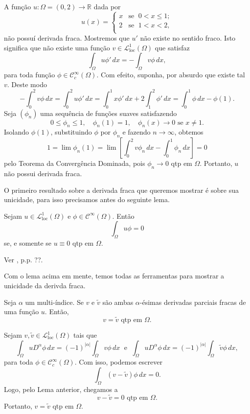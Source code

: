 \documentclass[a4paper, 11pt]{book}
\theoremstyle{definition}
\newcommand{\bR}{\mathbb{R}}
\newcommand{\cC}{\mathcal{C}}
\newcommand{\cL}{\mathcal{L}}
\newcommand{\loc}{\mathrm{loc}}
\begin{document}
\begin{ex}
    A função $u : \Omega  = (0,2) \to \bR$ dada por
    \[
        u(x) = \left\{
            \begin{array}{rl}
                x & \text{se }\; 0 < x \leqslant 1;\\
                2 & \text{se }\; 1 < x < 2,\\
            \end{array}
        \right.
    \]
    não possuí derivada fraca.
    Mostremos que $u'$ não existe no sentido fraco.
    Isto significa que não existe uma função $v \in \cL^1_\loc(\Omega)$ que satisfaz
    \[
        \int_\Omega u \phi' \, dx = -\int_\Omega v \phi \,dx,
    \]
    para toda função $\phi \in \cC_c^\infty(\Omega)$. 
    Com efeito, suponha, por absurdo que existe tal $v$. Deste modo
    \[
        -\int_0^2 v \phi \, dx = \int_0^2 u \phi' \,dx = \int_0^1 x \phi' \,dx + 2\int_1^2 \phi' \,dx = \int_0^1 \phi \,dx - \phi(1).
    \]
    Seja $(\phi_n)$ uma sequência de funções suaves satisfazendo
    \[
        0 \leqslant \phi_n \leqslant 1, \quad \phi_n(1) = 1, \quad \phi_n(x) \to 0 \text{ se } x \neq 1.
    \]
    Isolando $\phi(1)$, substituindo $\phi$ por $\phi_n$ e fazendo $n \to \infty$, obtemos
    \[
        1 = \lim \phi_n(1) = \lim \left[ \int_0^2 v \phi_n \, dx- \int_0^1 \phi_n \,dx \right] = 0
    \]
    pelo Teorema da Convergência Dominada, pois $\phi_n \to 0$ qtp em $\Omega$.
    Portanto, $u$ não possui derivada fraca.
\end{ex}

O primeiro resultado sobre a derivada fraca que queremos mostrar é sobre sua unicidade, para isso precisamos antes do seguinte lema.

\begin{lbox}
    Sejam $u \in \cL^1_{\loc}(\Omega)$ e $\phi \in \cC^\infty(\Omega)$.
    Então
    \[
        \int_\Omega u \phi = 0
    \]
    se, e somente se $u \equiv 0$ qtp em $\Omega$.
\end{lbox}
\begin{prf}
    Ver \cite{brezis-functional.analysis}, p.p. ??.
\end{prf}

Com o lema acima em mente, temos todas as ferramentas para mostrar a unicidade da derivda fraca.

\begin{pbox}
    Seja $\alpha$ um multi-índice. Se $v$ e $\tilde v$ são ambas $\alpha$-ésimas derivadas parciais fracas de uma função $u$.
    Então,
    \[
        v = \tilde v \text{ qtp em } \Omega.
    \]
\end{pbox}
\begin{prf}
    Sejam $v, \tilde v \in \cL^1_{\mathrm{loc}}(\Omega)$ tais que
    \[
        \int_\Omega u D^\alpha \phi \,dx = (-1)^{|\alpha|} \int_\Omega v \phi \,dx \;\text{ e }\; \int_\Omega u D^\alpha \phi \, dx= (-1)^{|\alpha|}\int_\Omega \tilde v \phi \,dx,
    \]
    para toda $\phi \in \cC^\infty_c(\Omega)$. Com isso, podemos escrever
    \[
        \int_\Omega (v - \tilde v) \phi \, dx = 0.
    \]
    Logo, pelo Lema anterior, chegamos a
    \[
        v - \tilde v = 0 \text{ qtp em } \Omega.
    \]
    Portanto, $v = \tilde v$ qtp em $\Omega$.
\end{prf}
\end{document}
